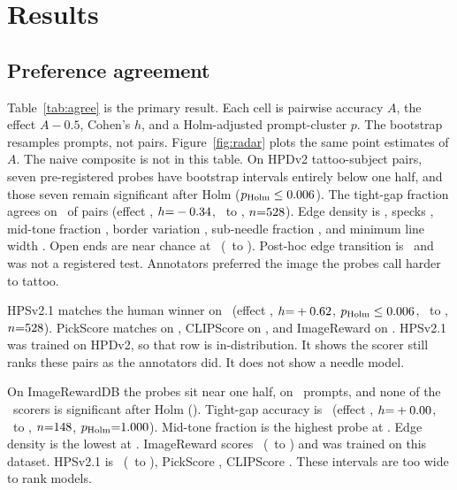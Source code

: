 \section{Results}
\label{sec:results}

\subsection{Preference agreement}
Table~\ref{tab:agree} is the primary result.
Each cell is pairwise accuracy $A$, the effect $A-0.5$, Cohen's $h$, and a Holm-adjusted prompt-cluster $p$.
The bootstrap resamples prompts, not pairs.
Figure~\ref{fig:radar} plots the same point estimates of $A$.
The naive composite is not in this table.
On HPDv2 tattoo-subject pairs, seven pre-registered probes have bootstrap intervals entirely below one half, and those seven remain significant after Holm ($p_{\mathrm{Holm}}\le0.006$).
The tight-gap fraction agrees on \HpdFractightgapfiveAcc\ of pairs (effect \HpdFractightgapfiveEffect, $h{=}-0.34$, \HpdFractightgapfiveLo\ to \HpdFractightgapfiveHi, $n{=}528$).
Edge density is \HpdEdgedensitypermmfiveAcc, specks \HpdSpeckspercmfiveAcc, mid-tone fraction \HpdMidtonefracfiveAcc, border variation \HpdBorderstdfiveAcc, sub-needle fraction \HpdFracsubneedlefiveAcc, and minimum line width \HpdLinewpmmfiveAcc.
Open ends are near chance at \HpdOpenendspercmfiveAcc\ (\HpdOpenendspercmfiveLo\ to \HpdOpenendspercmfiveHi).
Post-hoc edge transition is \HpdEdgetransitionmmfiveAcc\ and was not a registered test.
Annotators preferred the image the probes call harder to tattoo.

HPSv2.1 matches the human winner on \HpdHpstwoAcc\ (effect \HpdHpstwoEffect, $h{=}+0.62$, $p_{\mathrm{Holm}}\le0.006$, \HpdHpstwoLo\ to \HpdHpstwoHi, $n{=}528$).
PickScore matches on \HpdPickscoreAcc, CLIPScore on \HpdClipscoreAcc, and ImageReward on \HpdImagerewardAcc.
HPSv2.1 was trained on HPDv2, so that row is in-distribution.
It shows the scorer still ranks these pairs as the annotators did.
It does not show a needle model.

On ImageRewardDB the probes sit near one half, on \NIrTsprompts\ prompts, and none of the \NIrTests\ scorers is significant after Holm (\NIrSigholm).
Tight-gap accuracy is \IrFractightgapfiveAcc\ (effect \IrFractightgapfiveEffect, $h{=}+0.00$, \IrFractightgapfiveLo\ to \IrFractightgapfiveHi, $n{=}148$, $p_{\mathrm{Holm}}{=}1.000$).
Mid-tone fraction is the highest probe at \IrMidtonefracfiveAcc.
Edge density is the lowest at \IrEdgedensitypermmfiveAcc.
ImageReward scores \IrImagerewardAcc\ (\IrImagerewardLo\ to \IrImagerewardHi) and was trained on this dataset.
HPSv2.1 is \IrHpstwoAcc\ (\IrHpstwoLo\ to \IrHpstwoHi), PickScore \IrPickscoreAcc, CLIPScore \IrClipscoreAcc.
These intervals are too wide to rank models.

